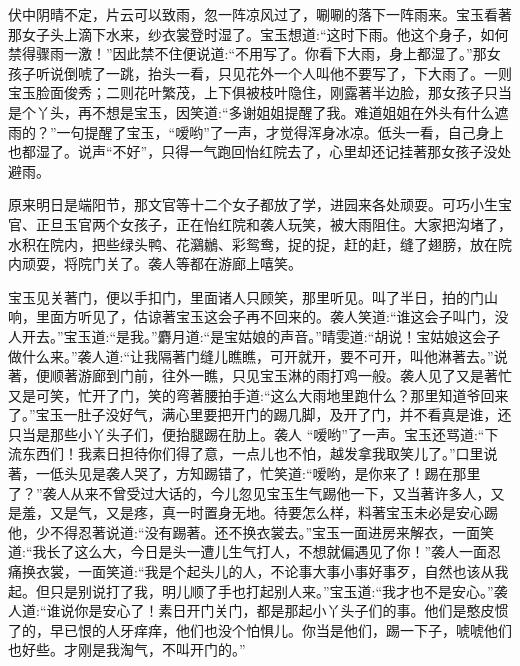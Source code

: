 \begin{parag}
    伏中阴晴不定，片云可以致雨，忽一阵凉风过了，唰唰的落下一阵雨来。宝玉看著那女子头上滴下水来，纱衣裳登时湿了。宝玉想道:“这时下雨。他这个身子，如何禁得骤雨一激！”因此禁不住便说道:“不用写了。你看下大雨，身上都湿了。”那女孩子听说倒唬了一跳，抬头一看，只见花外一个人叫他不要写了，下大雨了。一则宝玉脸面俊秀；二则花叶繁茂，上下俱被枝叶隐住，刚露著半边脸，那女孩子只当是个丫头，再不想是宝玉，因笑道:“多谢姐姐提醒了我。难道姐姐在外头有什么遮雨的？”一句提醒了宝玉，“嗳哟”了一声，才觉得浑身冰凉。低头一看，自己身上也都湿了。说声“不好”，只得一气跑回怡红院去了，心里却还记挂著那女孩子没处避雨。
\end{parag}


\begin{parag}
    原来明日是端阳节，那文官等十二个女子都放了学，进园来各处顽耍。可巧小生宝官、正旦玉官两个女孩子，正在怡红院和袭人玩笑，被大雨阻住。大家把沟堵了，水积在院内，把些绿头鸭、花鸂鶒、彩鸳鸯，捉的捉，赶的赶，缝了翅膀，放在院内顽耍，将院门关了。袭人等都在游廊上嘻笑。
\end{parag}


\begin{parag}
    宝玉见关著门，便以手扣门，里面诸人只顾笑，那里听见。叫了半日，拍的门山响，里面方听见了，估谅著宝玉这会子再不回来的。袭人笑道:“谁这会子叫门，没人开去。”宝玉道:“是我。”麝月道:“是宝姑娘的声音。”晴雯道:“胡说！宝姑娘这会子做什么来。”袭人道:“让我隔著门缝儿瞧瞧，可开就开，要不可开，叫他淋著去。”说著，便顺著游廊到门前，往外一瞧，只见宝玉淋的雨打鸡一般。袭人见了又是著忙又是可笑，忙开了门，笑的弯著腰拍手道:“这么大雨地里跑什么？那里知道爷回来了。”宝玉一肚子没好气，满心里要把开门的踢几脚，及开了门，并不看真是谁，还只当是那些小丫头子们，便抬腿踢在肋上。袭人 “嗳哟”了一声。宝玉还骂道:“下流东西们！我素日担待你们得了意，一点儿也不怕，越发拿我取笑儿了。”口里说著，一低头见是袭人哭了，方知踢错了，忙笑道:“嗳哟，是你来了！踢在那里了？”袭人从来不曾受过大话的，今儿忽见宝玉生气踢他一下，又当著许多人，又是羞，又是气，又是疼，真一时置身无地。待要怎么样，料著宝玉未必是安心踢他，少不得忍著说道:“没有踢著。还不换衣裳去。”宝玉一面进房来解衣，一面笑道:“我长了这么大，今日是头一遭儿生气打人，不想就偏遇见了你！”袭人一面忍痛换衣裳，一面笑道:“我是个起头儿的人，不论事大事小事好事歹，自然也该从我起。但只是别说打了我，明儿顺了手也打起别人来。”宝玉道:“我才也不是安心。”袭人道:“谁说你是安心了！素日开门关门，都是那起小丫头子们的事。他们是憨皮惯了的，早已恨的人牙痒痒，他们也没个怕惧儿。你当是他们，踢一下子，唬唬他们也好些。才刚是我淘气，不叫开门的。”
\end{parag}


